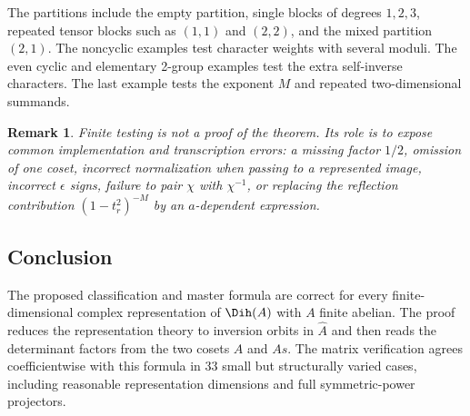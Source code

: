 \documentclass[10pt]{article}
\newtheorem{remark}{Remark}
\begin{document}
The partitions include the empty partition, single blocks of degrees
$1,2,3$, repeated tensor blocks such as $(1,1)$ and $(2,2)$, and the mixed
partition $(2,1)$.  The noncyclic examples test character weights with several
moduli.  The even cyclic and elementary 2-group examples test the extra
self-inverse characters.  The last example tests the exponent $M$ and repeated
two-dimensional summands.

\medskip
\noindent{}
\medskip

\begin{remark}
Finite testing is not a proof of the theorem.  Its role is to expose common
implementation and transcription errors: a missing factor $1/2$, omission of
one coset, incorrect normalization when passing to a represented image, incorrect
$\epsilon$ signs, failure to pair $\chi$ with $\chi^{-1}$, or replacing the
reflection contribution $(1-t_r^2)^{-M}$ by an $a$-dependent expression.
\end{remark}

\subsection{Conclusion}

The proposed classification and master formula are correct for every
finite-dimensional complex representation of $\Dih(A)$ with $A$ finite
abelian.  The proof reduces the representation theory to inversion orbits in
$\widehat A$ and then reads the determinant factors from the two cosets
$A$ and $As$.  The matrix verification agrees coefficientwise with this
formula in 33 small but structurally varied cases, including reasonable
representation dimensions and full symmetric-power projectors.
\endgroup


\clearpage
\end{document}
